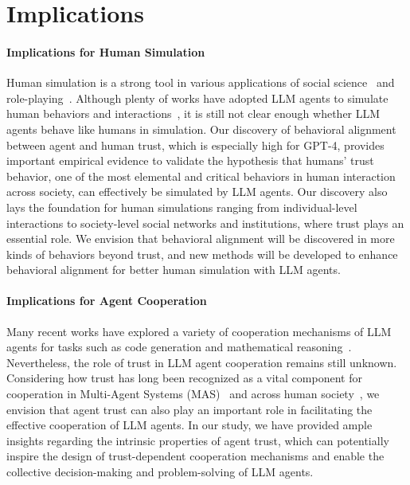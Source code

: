 \vspace{-2mm}
\section{Implications}
\label{appendix:Implications}
\vspace{-0.5mm}


\vspace{-1mm}
\paragraph{Implications for Human Simulation} 
Human simulation is a strong tool in various applications of social science~\citep{manning2024automated} and role-playing~\citep{Shanahan2023role,chen2024persona}.
Although plenty of works have adopted LLM agents to simulate human behaviors and interactions~\citep{zhou2023sotopia,gao2023large,xu2024ai}, it is still not clear enough whether LLM agents behave like humans in simulation. Our discovery of behavioral alignment between agent and human trust, which is especially high for GPT-4, provides important empirical evidence to validate the hypothesis that humans' trust behavior, one of the most elemental and critical behaviors in human interaction across society, can effectively be simulated by LLM agents. Our discovery also lays the foundation for human simulations ranging from individual-level interactions to society-level social networks and institutions, where trust plays an essential role. We envision that behavioral alignment will be discovered in more kinds of behaviors beyond trust, and new methods will be developed to enhance behavioral alignment for better human simulation with LLM agents. 





\vspace{-2mm}
\paragraph{Implications for Agent Cooperation}


Many recent works have explored a variety of cooperation mechanisms of LLM agents for tasks such as code generation and mathematical reasoning~\citep{li2023camel,zhang2023exploring,liu2023dynamic}. Nevertheless, the role of trust in LLM agent cooperation remains still unknown. Considering how trust has long been recognized as a vital component for cooperation in Multi-Agent Systems (MAS)~\citep{ramchurn2004trust,burnett2011trust} and across human society~\citep{jones1998experience,kim2022trust,henrich2021origins}, we envision that agent trust can also play an important role in facilitating the effective cooperation of LLM agents. In our study, we have provided ample insights regarding the intrinsic properties of agent trust, which can potentially inspire the design of trust-dependent cooperation mechanisms and enable the collective decision-making and problem-solving of LLM agents.


